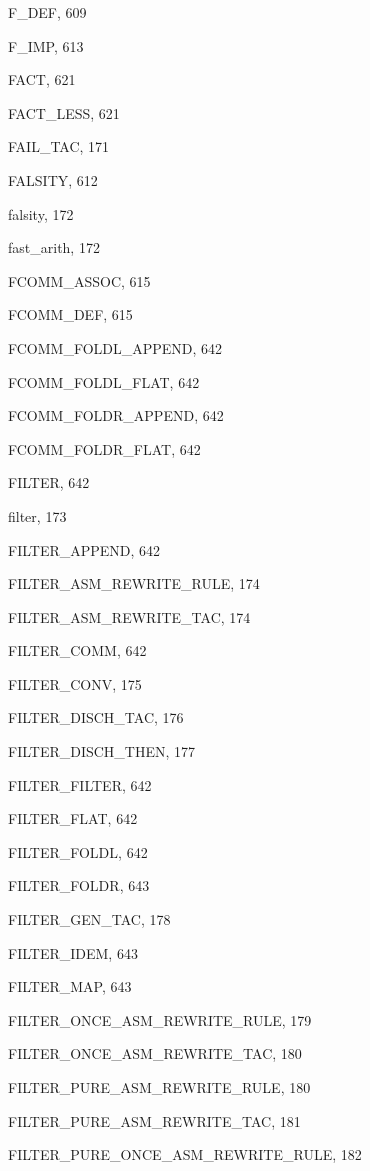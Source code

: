 \begin{theindex}
  \item {\ptt F\_DEF}, 609
  \item {\ptt F\_IMP}, 613
  \item {\ptt FACT}, 621
  \item {\ptt FACT\_LESS}, 621
  \item {\ptt FAIL\_TAC}, 171
  \item {\ptt FALSITY}, 612
  \item {\ptt falsity}, 172
  \item {\ptt fast\_arith}, 172
  \item {\ptt FCOMM\_ASSOC}, 615
  \item {\ptt FCOMM\_DEF}, 615
  \item {\ptt FCOMM\_FOLDL\_APPEND}, 642
  \item {\ptt FCOMM\_FOLDL\_FLAT}, 642
  \item {\ptt FCOMM\_FOLDR\_APPEND}, 642
  \item {\ptt FCOMM\_FOLDR\_FLAT}, 642
  \item {\ptt FILTER}, 642
  \item {\ptt filter}, 173
  \item {\ptt FILTER\_APPEND}, 642
  \item {\ptt FILTER\_ASM\_REWRITE\_RULE}, 174
  \item {\ptt FILTER\_ASM\_REWRITE\_TAC}, 174
  \item {\ptt FILTER\_COMM}, 642
  \item {\ptt FILTER\_CONV}, 175
  \item {\ptt FILTER\_DISCH\_TAC}, 176
  \item {\ptt FILTER\_DISCH\_THEN}, 177
  \item {\ptt FILTER\_FILTER}, 642
  \item {\ptt FILTER\_FLAT}, 642
  \item {\ptt FILTER\_FOLDL}, 642
  \item {\ptt FILTER\_FOLDR}, 643
  \item {\ptt FILTER\_GEN\_TAC}, 178
  \item {\ptt FILTER\_IDEM}, 643
  \item {\ptt FILTER\_MAP}, 643
  \item {\ptt FILTER\_ONCE\_ASM\_REWRITE\_RULE}, 179
  \item {\ptt FILTER\_ONCE\_ASM\_REWRITE\_TAC}, 180
  \item {\ptt FILTER\_PURE\_ASM\_REWRITE\_RULE}, 180
  \item {\ptt FILTER\_PURE\_ASM\_REWRITE\_TAC}, 181
  \item {\ptt FILTER\_PURE\_ONCE\_ASM\_REWRITE\_RULE}, 182

\end{theindex}
